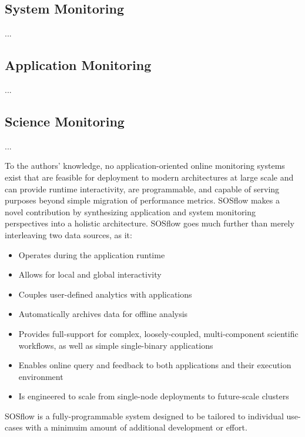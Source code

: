 \subsection{System Monitoring}
%
...
%
\subsection{Application Monitoring}
%
...
%
\subsection{Science Monitoring}
%
...
%
\par
%
To the authors' knowledge, no application-oriented online monitoring systems
exist that are feasible for deployment to modern architectures at large scale
and can provide runtime interactivity, are programmable, and capable of
serving purposes beyond simple migration of performance metrics.
%
SOSflow makes a novel contribution by synthesizing application and system
monitoring perspectives into a holistic architecture.
%
SOSflow goes much further than merely interleaving two data sources, as it:
%
\begin{itemize}
    \item Operates during the application runtime
    \item Allows for local and global interactivity
    \item Couples user-defined analytics with applications
    \item Automatically archives data for offline analysis
    \item Provides full-support for complex, loosely-coupled,
        multi-component scientific workflows, as well as simple
        single-binary applications        
    \item Enables online query and feedback to both applications
        and their execution environment
    \item Is engineered to scale from single-node deployments
        to future-scale clusters
\end{itemize}
%
SOSflow is a fully-programmable system designed to be tailored to individual
use-cases with a minimuim amount of additional development or effort.
%
